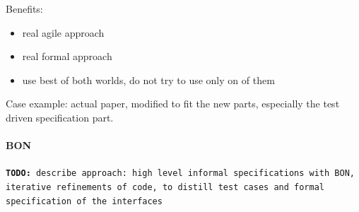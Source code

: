 \documentclass{article} \usepackage{times}
\newcommand{\todo}[1]{\texttt{\textbf{TODO:} #1}}
\begin{document}
Benefits:
\begin{itemize}
\item real agile approach
\item real formal approach
\item use best of both worlds, do not try to use only on of them
\end{itemize}

Case example: actual paper, modified to fit the new parts, especially
the test driven specification part.

\paragraph*{BON}

\todo{describe approach: high level informal specifications with BON,
  iterative refinements of code, to distill test cases and formal
  specification of the interfaces}




 

\end{document}

